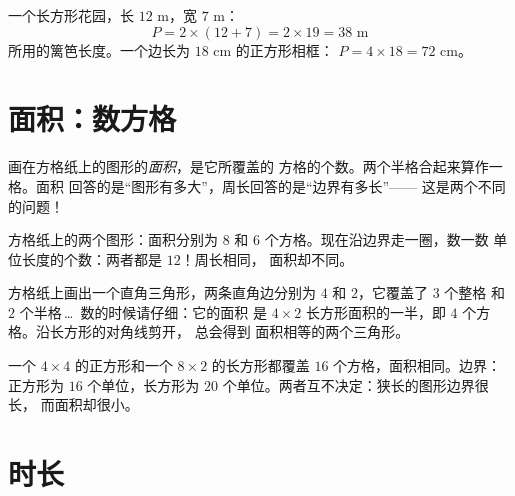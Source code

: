 \begin{example}\label{ex:g4:measure:perimeter}
一个长方形花园，长 $12$ m，宽 $7$ m：
\[
P = 2 \times (12 + 7) = 2 \times 19 = 38 \text{ m}
\]
所用的篱笆长度。一个边长为 $18$ cm 的正方形相框：
$P = 4 \times 18 = 72$ cm。
\end{example}

\section{面积：数方格}

\begin{definition}[数方格求面积]\label{def:g4:measure:area}
画在方格纸上的图形的\emph{面积}，是它所覆盖的
方格的个数。两个半格合起来算作一格。面积
回答的是“图形有多大”，周长回答的是“边界有多长”——
这是两个不同的问题！
\end{definition}

\begin{omfigure}

{\small 方格纸上的两个图形：面积分别为 $8$ 和 $6$ 个方格。现在沿边界走一圈，数一数
单位长度的个数：两者都是 $12$！周长相同，
面积却不同。}
\end{omfigure}

\begin{example}[半格]\label{ex:g4:measure:half}
方格纸上画出一个直角三角形，两条直角边分别为 $4$ 和 $2$，它覆盖了 $3$ 个整格
和 $2$ 个半格\,\dots\ 数的时候请仔细：它的面积
是 $4 \times 2$ 长方形面积的一半，即 $4$ 个方格。沿长方形的对角线剪开，
总会得到
面积相等的两个三角形。
\end{example}

\begin{example}\label{ex:g4:measure:samearea}
一个 $4 \times 4$ 的正方形和一个 $8 \times 2$ 的长方形都覆盖 $16$
个方格，面积相同。边界：正方形为 $16$ 个单位，长方形为 $20$
个单位。两者互不决定：狭长的图形边界很长，
而面积却很小。
\end{example}

\section{时长}

